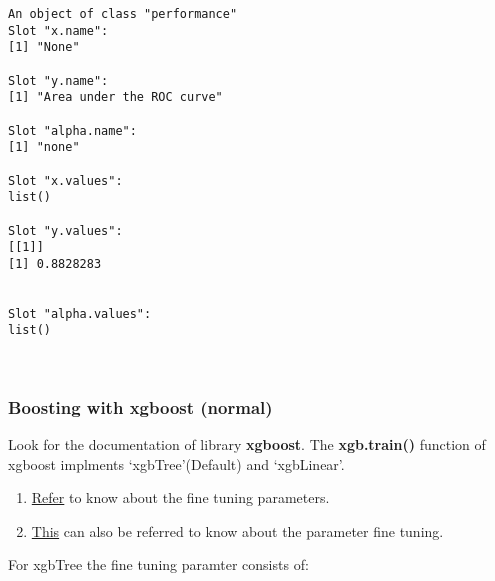\documentclass[11pt]{article}
\providecommand{\tightlist}{%
      \setlength{\itemsep}{0pt}\setlength{\parskip}{0pt}}
\begin{document}
    
    \begin{verbatim}
An object of class "performance"
Slot "x.name":
[1] "None"

Slot "y.name":
[1] "Area under the ROC curve"

Slot "alpha.name":
[1] "none"

Slot "x.values":
list()

Slot "y.values":
[[1]]
[1] 0.8828283


Slot "alpha.values":
list()

    \end{verbatim}

    
    \begin{center}
    \end{center}
    { \hspace*{\fill} \\}
    
    \hypertarget{boosting-with-xgboost-normal}{%
\subsubsection{Boosting with xgboost
(normal)}\label{boosting-with-xgboost-normal}}

Look for the documentation of library \textbf{xgboost}. The
\textbf{xgb.train()} function of xgboost implments `xgbTree'(Default)
and `xgbLinear'.

    \begin{enumerate}
\def\labelenumi{\arabic{enumi}.}
\tightlist
\item
  \href{https://www.analyticsvidhya.com/blog/2016/03/complete-guide-parameter-tuning-xgboost-with-codes-python/}{Refer}
  to know about the fine tuning parameters.
\item
  \href{http://topepo.github.io/caret/train-models-by-tag.html\#Boosting}{This}
  can also be referred to know about the parameter fine tuning.
\end{enumerate}

For xgbTree the fine tuning paramter consists of:
\end{document}

